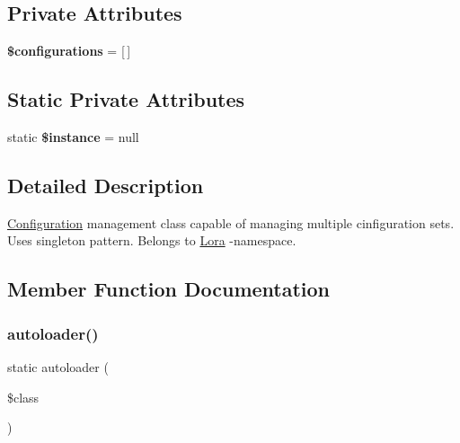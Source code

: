 \subsection*{Private Attributes}
\begin{DoxyCompactItemize}
\item 
\mbox{\label{class_lora_1_1_config_a3d0d06c2ac189761041669f7fbcb6ba5}} 
{\bfseries \$configurations} = \mbox{[}$\,$\mbox{]}
\end{DoxyCompactItemize}
\subsection*{Static Private Attributes}
\begin{DoxyCompactItemize}
\item 
\mbox{\label{class_lora_1_1_config_ad9d7ce33ebb142b70e58b68052ca0ea8}} 
static {\bfseries \$instance} = null
\end{DoxyCompactItemize}


\subsection{Detailed Description}
\hyperlink{class_lora_1_1_configuration}{Configuration} management class capable of managing multiple cinfiguration sets. Uses singleton pattern. Belongs to \hyperlink{namespace_lora}{Lora} -\/namespace. 

\subsection{Member Function Documentation}
\mbox{\label{class_lora_1_1_config_a5d5d9fa893f5a5a8db61062e78248450}} 
\subsubsection{\texorpdfstring{autoloader()}{autoloader()}}
{\footnotesize\ttfamily static autoloader (\begin{DoxyParamCaption}\item[{}]{\$class }\end{DoxyParamCaption})\hspace{0.3cm}{\ttfamily [static]}}

